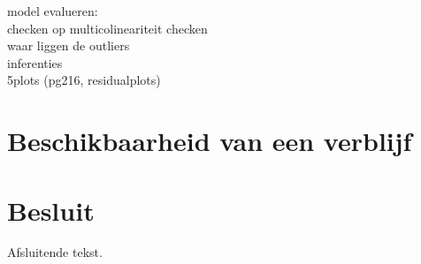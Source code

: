 \documentclass[a4paper,kulak]{kulakarticle} %
\begin{document}
model evalueren:\\
checken op multicolineariteit checken\\
waar liggen de outliers\\
inferenties\\
5plots (pg216, residualplots)

\section{Beschikbaarheid van een verblijf}


\section*{Besluit}

Afsluitende tekst.
\end{document}
